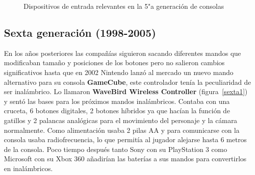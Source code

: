 \begin{figure}[t]
\hfill
     \hfill
     \caption{Dispositivos de entrada relevantes en la 5"a  generaci\'on de consolas}
     \label{fig:quinta}
   \end{figure}


\subsection{Sexta generaci\'on (1998-2005)}

En los a\~nos posteriores las compa\~n\'ias siguieron sacando diferentes mandos que modificaban tama\~no y posiciones de los botones pero no salieron cambios significativos hasta que en 2002 Nintendo lanz\'o al mercado un nuevo mando alternativo para su consola \textbf{GameCube}, este controlador ten\'ia la peculiaridad de ser inal\'ambrico. Lo llamaron \textbf{WaveBird Wireless Controller} (figura~\ref{sexta1}) y sent\'o las bases para los pr\'oximos mandos inal\'ambricos. Contaba con una cruceta, 6 botones digitales, 2 botones h\'ibridos ya que hac\'ian la funci\'on de gatillos y 2 palancas anal\'ogicas para el movimiento del personaje y la c\'amara normalmente. Como alimentaci\'on usaba 2 pilas AA y para comunicarse con la consola usaba radiofrecuencia, lo que permit\'ia al jugador alejarse hasta 6 metros de la consola. Poco tiempo despu\'es tanto Sony con su PlayStation 3 como Microsoft con su Xbox 360 a\~nadir\'ian las bater\'ias a sus mandos para convertirlos en inal\'ambricos. \\

